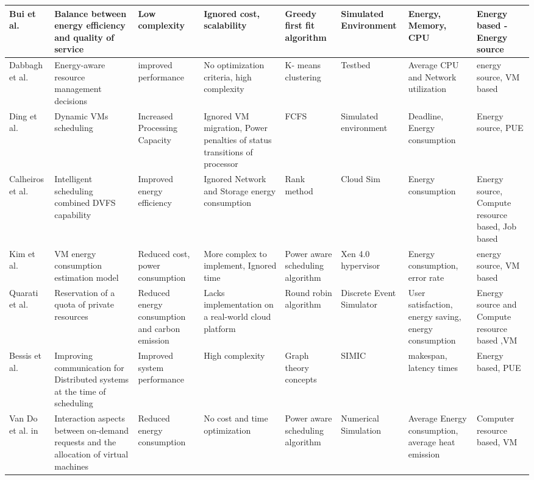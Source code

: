 \begin{table*}[!htbp]
{\begin{tabular}{|p{1.5cm} p{2cm} p{2cm} p{2cm} p{2cm} p{2cm} p{2cm} p{2cm}|}
Bui  et al.~\cite{bui2016energy} & Balance between energy efficiency and quality of service & Low complexity & Ignored cost, scalability & Greedy first fit algorithm & Simulated Environment & Energy, Memory, CPU & Energy based -Energy source
\\ \hline 

Dabbagh et al.~\cite{dabbagh2015energy} &  Energy-aware resource management decisions  & improved performance & No optimization criteria, high complexity& K- means clustering& Testbed & Average CPU and Network utilization & energy source, VM based
\\ \hline

Ding  et al.~\cite{ding2015energy} & Dynamic VMs scheduling & Increased Processing Capacity & Ignored VM migration, Power penalties of status transitions of processor & FCFS & Simulated environment  & Deadline, Energy consumption & Energy source, PUE
\\ \hline 

Calheiros et al.~\cite{calheiros2014energy} & Intelligent scheduling combined DVFS capability  &  Improved energy efficiency  & Ignored Network and Storage energy consumption  &  Rank method   & Cloud Sim & Energy consumption & Energy source, Compute resource based, Job based
\\ \hline 

Kim et al.~\cite{kim2014energy} & VM energy consumption estimation model & Reduced cost, power consumption & More complex to implement, Ignored time & Power aware scheduling algorithm & Xen 4.0 hypervisor & Energy consumption, error rate & energy source, VM based
\\ \hline

Quarati et al.~\cite{quarati2013hybrid} &  Reservation of a quota of private resources & Reduced energy consumption and carbon emission & Lacks implementation on a real-world cloud platform & Round robin algorithm & Discrete Event Simulator & User satisfaction, energy saving, energy consumption & Energy source and  Compute resource based ,VM 
\\ \hline

Bessis et al.~\cite{bessis2013using} & Improving communication for Distributed systems at the time of scheduling & Improved system performance & High complexity & Graph theory concepts & SIMIC & makespan, latency times & Energy based, PUE
\\ \hline 

Van Do et al. in~\cite{van2012comparison} & Interaction aspects between on-demand requests and the allocation of virtual machines & Reduced energy consumption & No cost and time optimization & Power aware scheduling algorithm & Numerical Simulation & Average Energy consumption, average heat emission & Computer resource based, VM
\\ \hline


\end{tabular}}
\end{table*}
